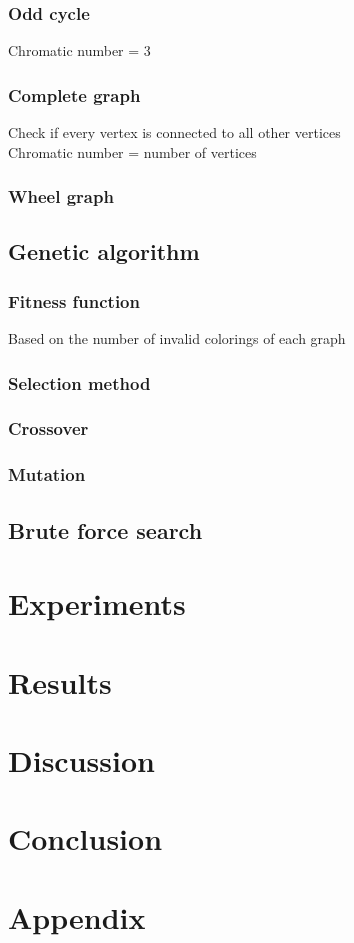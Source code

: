 \documentclass[a4paper]{report}
\begin{document}
			\subsection{Odd cycle}
			Chromatic number = 3
			\subsection{Complete graph}
			Check if every vertex is connected to all other vertices\\
			Chromatic number = number of vertices
			\subsection{Wheel graph}
			
		\section{Genetic algorithm}
			\subsection{Fitness function}
			Based on the number of invalid colorings of each graph
			\subsection{Selection method}
			\subsection{Crossover}
			\subsection{Mutation}
		
		\section{Brute force search}
		
		
	\chapter{Experiments}
		
	\chapter{Results}
	
	\chapter{Discussion}
	
	\chapter{Conclusion}
	
	
	
	
	
	\appendix
	\chapter*{Appendix}
\end{document}
